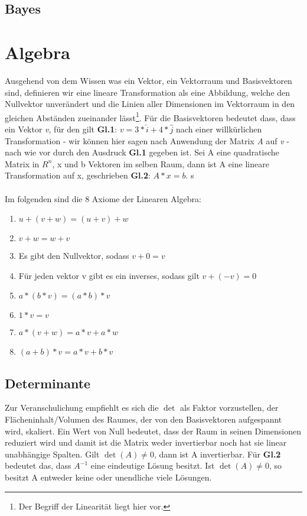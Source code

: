 \documentclass[letterpaper, titlepage]{article}
\begin{document}
\subsection{Bayes}\label{Bayes}


\section{Algebra}\label{Algebra}
Ausgehend von dem Wissen was ein Vektor, ein Vektorraum und Basisvektoren sind, definieren wir eine lineare Transformation als eine Abbildung, welche den Nullvektor unverändert und die Linien aller Dimensionen im Vektorraum in den gleichen Abständen zueinander lässt\footnote[1]{Der Begriff der Linearität liegt hier vor.}. Für die Basisvektoren bedeutet dass, dass ein Vektor \textit{v}, für den gilt \textbf{Gl.1}: $v=3*\hat{i}+4*\hat{j}$ nach einer willkürlichen Transformation - wir können hier sagen nach Anwendung der Matrix \textit{A} auf \textit{v} - nach wie vor durch den Ausdruck \textbf{Gl.1} gegeben ist. Sei A eine quadratische Matrix in $R^n$, x und b Vektoren im selben Raum, dann ist A eine lineare Transformation auf x, geschrieben \textbf{Gl.2}: $A*x=b$. s
\\
\vspace{0.1cm}
\\
Im folgenden sind die 8 Axiome der Linearen Algebra:
\begin{enumerate}
    \item $u+(v+w)=(u+v)+w$
    \item $v+w=w+v$
    \item Es gibt den Nullvektor, sodass $v+0=v$
    \item Für jeden vektor v gibt es ein inverses, sodass gilt $v+(-v)=0$
    \item $a*(b*v)=(a*b)*v$
    \item $1*v=v$
    \item $a*(v+w)=a*v+a*w$
    \item $(a+b)*v=a*v+b*v$
\end{enumerate}


\subsection{Determinante}\label{Determinante}
Zur Veranschulichung empfiehlt es sich die $\det$ als Faktor vorzustellen, der Flächeninhalt/Volumen des Raumes, der von den Basisvektoren aufgespannt wird, skaliert. Ein Wert von Null bedeutet, dass der Raum in seinen Dimensionen reduziert wird und damit ist die Matrix weder invertierbar noch hat sie linear unabhängige Spalten. Gilt $\det(A)\neq0$, dann ist A invertierbar. Für \textbf{Gl.2} bedeutet das, dass $A^{-1}$ eine eindeutige Lösung besitzt. Ist $\det(A)\neq0$, so besitzt A entweder keine oder unendliche viele Lösungen.
\end{document}
